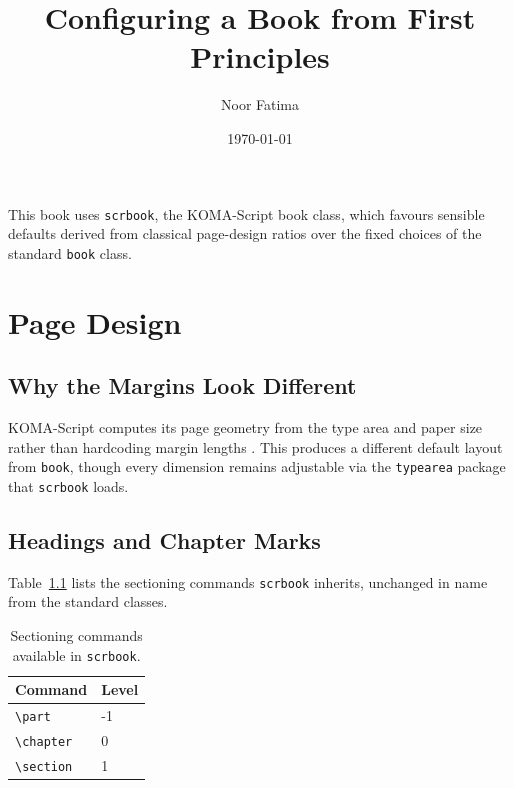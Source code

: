 \documentclass[11pt,twoside]{scrbook}
\title{Configuring a Book from First Principles}
\author{Noor Fatima}
\date{\today}
\begin{document}
\frontmatter
\maketitle

This book uses \texttt{scrbook}, the KOMA-Script book class, which favours
sensible defaults derived from classical page-design ratios over the fixed
choices of the standard \texttt{book} class.

\tableofcontents

\mainmatter

\chapter{Page Design}

\section{Why the Margins Look Different}

KOMA-Script computes its page geometry from the type area and paper size
rather than hardcoding margin lengths \citep{knuth1984texbook}. This produces
a different default layout from \texttt{book}, though every dimension remains
adjustable via the \texttt{typearea} package that \texttt{scrbook} loads.

\section{Headings and Chapter Marks}

Table~\ref{tab:levels} lists the sectioning commands \texttt{scrbook}
inherits, unchanged in name from the standard classes.

\begin{table}[h]
  \centering
  \begin{tabular}{ll}
    \toprule
    Command & Level \\
    \midrule
    \verb|\part|    & -1 \\
    \verb|\chapter| & 0 \\
    \verb|\section| & 1 \\
    \bottomrule
  \end{tabular}
  \caption{Sectioning commands available in \texttt{scrbook}.}
  \label{tab:levels}
\end{table}
\end{document}
